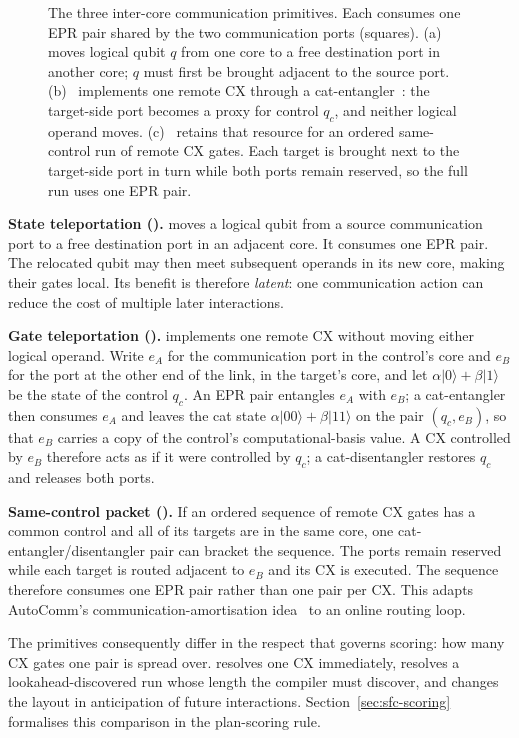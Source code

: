 \begin{figure}[t]
\caption{The three inter-core communication primitives. Each consumes one
EPR pair shared by the two communication ports (squares). (a)~\TeleData{}
moves logical qubit $q$ from one core to a free destination port in another
core; $q$ must first be brought adjacent to the source port.
(b)~\TeleGate{} implements one remote CX through a
cat-entangler~\cite{yimsiriwattana2004generalized}: the
target-side port becomes a proxy for control $q_c$, and neither logical
operand moves. (c)~\TeleGatePacket{} retains that resource for an ordered
same-control run of remote CX gates. Each target is brought next to the
target-side port in turn while both ports remain reserved, so the full run
uses one EPR pair.}
\label{fig:primitives}
\end{figure}

\textbf{State teleportation (\TeleData{}).} \TeleData{} moves a logical
qubit from a source communication port to a free destination port in an
adjacent core. It consumes one EPR pair. The relocated qubit may then meet
subsequent operands in its new core, making their gates local. Its benefit
is therefore \emph{latent}: one communication action can reduce the cost of
multiple later interactions.

\textbf{Gate teleportation (\TeleGate{}).} \TeleGate{} implements one
remote CX without moving either logical operand. Write $e_A$ for the
communication port in the control's core and $e_B$ for the port at the other
end of the link, in the target's core, and let
$\alpha|0\rangle+\beta|1\rangle$ be the state of the control $q_c$. An EPR
pair entangles $e_A$ with $e_B$; a cat-entangler then consumes $e_A$ and
leaves the cat state $\alpha|00\rangle+\beta|11\rangle$ on the pair
$(q_c,e_B)$, so that $e_B$ carries a copy of the control's
computational-basis value. A CX controlled by $e_B$ therefore acts as
if it were controlled by $q_c$; a cat-disentangler restores $q_c$ and
releases both ports. 

\textbf{Same-control packet (\TeleGatePacket{}).} If an ordered sequence
of remote CX gates has a common control and all of its targets are in the
same core, one cat-entangler/disentangler pair can bracket the sequence.
The ports remain reserved while each target is routed adjacent to $e_B$ and
its CX is executed. The sequence therefore consumes one EPR pair rather
than one pair per CX. This adapts AutoComm's communication-amortisation
idea~\cite{wu2022autocomm} to an online routing loop.

The primitives consequently differ in the respect that governs
scoring: how many CX gates one pair is spread over.
\TeleGate{} resolves one CX immediately, \TeleGatePacket{} resolves a
lookahead-discovered run whose length the compiler must discover, and
\TeleData{} changes the layout in anticipation
of future interactions. Section~\ref{sec:sfc-scoring} formalises this
comparison in the plan-scoring rule.

